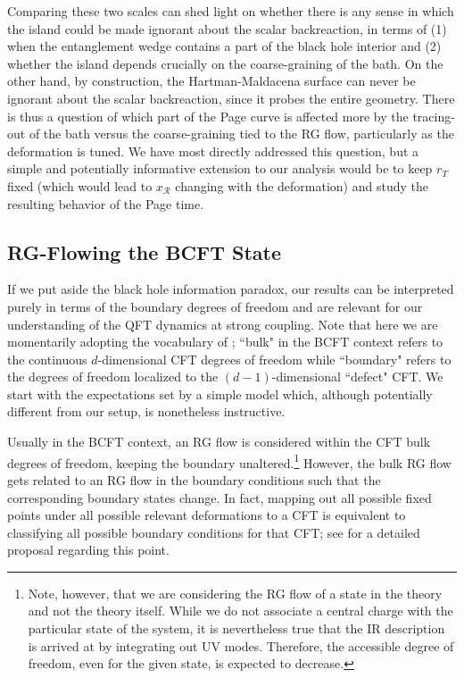 \documentclass[12pt,a4paper]{article}
\newcommand{\sanjit}[1]{\textcolor{red}{\textbf{??SS:} #1}}
\begin{document}
Comparing these two scales can shed light on whether there is any sense in which the island could be made ignorant about the scalar backreaction, in terms of (1) when the entanglement wedge contains a part of the black hole interior and (2) whether the island depends crucially on the coarse-graining of the bath. On the other hand, by construction, the Hartman-Maldacena surface can never be ignorant about the scalar backreaction, since it probes the entire geometry. There is thus a question of which part of the Page curve is affected more by the tracing-out of the bath versus the coarse-graining tied to the RG flow, particularly as the deformation is tuned. We have most directly addressed this question, but a simple and potentially informative extension to our analysis would be to keep $r_T$ fixed (which would lead to $x_\mathcal{R}$ changing with the deformation) and study the resulting behavior of the Page time.

\subsection*{RG-Flowing the BCFT State}

If we put aside the black hole information paradox, our results can be interpreted purely in terms of the boundary degrees of freedom and are relevant for our understanding of the QFT dynamics at strong coupling. Note that here we are momentarily adopting the vocabulary of \cite{Rozali:2019day}; ``bulk" in the BCFT context refers to the continuous $d$-dimensional CFT degrees of freedom while ``boundary" refers to the degrees of freedom localized to the $(d-1)$-dimensional ``defect" CFT. We start with the expectations set by a simple model which, although potentially different from our setup, is nonetheless instructive.

Usually in the BCFT context, an RG flow is considered within the CFT bulk degrees of freedom, keeping the boundary unaltered.\footnote{Note, however, that we are considering the RG flow of a state in the theory and not the theory itself. While we do not associate a central charge with the particular state of the system, it is nevertheless true that the IR description is arrived at by integrating out UV modes. Therefore, the accessible degree of freedom, even for the given state, is expected to decrease.} However, the bulk RG flow gets related to an RG flow in the boundary conditions such that the corresponding boundary states change. In fact, mapping out all possible fixed points under all possible relevant deformations to a CFT is equivalent to classifying all possible boundary conditions for that CFT; see \cite{Cardy:2017ufe} for a detailed proposal regarding this point. 
\end{document}
